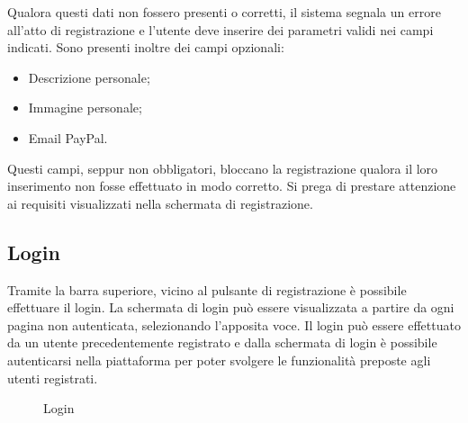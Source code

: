 Qualora questi dati non fossero presenti o corretti, il sistema segnala un errore all'atto di registrazione e l'utente deve inserire dei parametri validi nei campi indicati. Sono presenti inoltre dei campi opzionali:

\begin{itemize}
	\item Descrizione personale;
	\item Immagine personale;
	\item Email PayPal.
\end{itemize}

Questi campi, seppur non obbligatori, bloccano la registrazione qualora il loro inserimento non fosse effettuato in modo corretto. Si prega di prestare attenzione ai requisiti visualizzati nella schermata di registrazione.

\subsection{Login}

Tramite la barra superiore, vicino al pulsante di registrazione è possibile effettuare il login. La schermata di login può essere visualizzata a partire da ogni pagina non autenticata, selezionando l'apposita voce.
Il login può essere effettuato da un utente precedentemente registrato e dalla schermata di login è possibile autenticarsi nella piattaforma per poter svolgere le funzionalità preposte agli utenti registrati. 

\label{Login}
\begin{figure}[H]
	\centering
	\caption{Login}
\end{figure}

